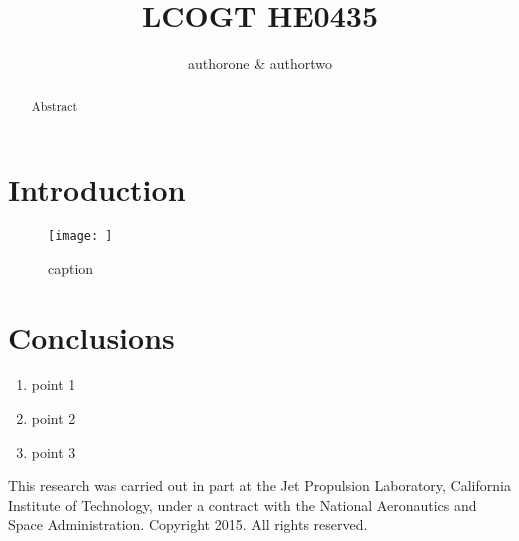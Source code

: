 \documentclass[iop]{emulateapj}
\begin{document}
\title{LCOGT HE0435}
\author{authorone \& authortwo}


\begin{abstract} {Abstract }
\end{abstract}

\section{Introduction}
\label{Introduction}

\begin{figure*}[tb!]
 \texttt{[image: ]}
 \caption{caption}
\label{fig_pretty_picture}
\end{figure*}

\section{Conclusions}

\begin{enumerate}
  \item point 1
  \item point 2
  \item point 3
\end{enumerate}


\acknowledgements

This research was carried out in part at the Jet Propulsion Laboratory,
California Institute of Technology, under a contract with the National
Aeronautics and Space Administration.  Copyright 2015. All rights reserved.


\end{document}
